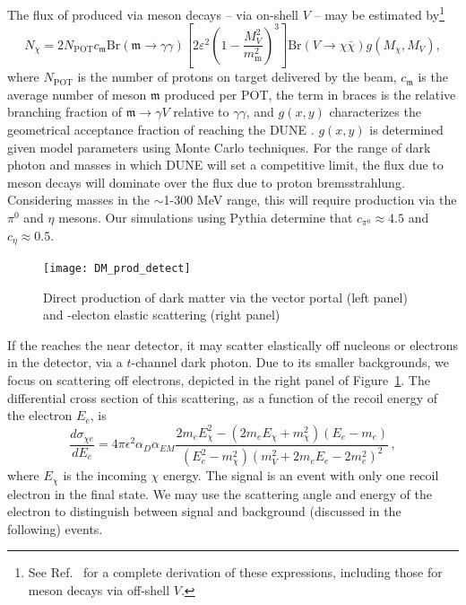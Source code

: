 The flux of  produced via meson decays -- via on-shell $V$ -- may be estimated by\footnote{See Ref.~\cite{DeRomeri:2019kic} for a complete derivation of these expressions, including those for meson decays via off-shell $V$.}
\begin{equation}
    N_\chi = 2 N_\mathrm{POT} c_\mathfrak{m} \mathrm{Br}(\mathfrak{m}\to \gamma\gamma) \left[ 2 \varepsilon^2 \left(1 - \frac{M_{V}^2}{m_\mathrm{m}^2}\right)^3\right] \mathrm{Br}(V \to \chi\bar{\chi}) g(M_\chi, M_{V}),
\end{equation}
where $N_\mathrm{POT}$ is the number of protons on target delivered by the beam, $c_\mathfrak{m}$ is the average number of meson $\mathfrak{m}$ produced per POT, the term in braces is the relative branching fraction of $\mathfrak{m} \to \gamma V$ relative to $\gamma\gamma$, and $g(x, y)$ characterizes the geometrical acceptance fraction of  reaching the DUNE . $g(x, y)$ is determined given model parameters using Monte Carlo techniques. For the range of dark photon and  masses in which DUNE will set a competitive limit, the  flux due to meson decays will dominate over the flux due to proton bremsstrahlung. Considering  masses in the $\sim$1-300 MeV range, this will require production via the $\pi^0$ and $\eta$ mesons. Our simulations using {\sc Pythia} determine that $c_{\pi^0} \approx 4.5$ and $c_\eta \approx 0.5$.

\begin{figure}[t]
\centering
\texttt{[image: DM\_prod\_detect]}
\caption[Direct production of DM via vector portal and DM-e$^-$ elastic scattering]{ 
Direct production of dark matter via the vector portal (left panel) and -electon elastic scattering (right panel)}
\label{fig:dm_prod}
\end{figure}

If the  reaches the near detector, it may scatter elastically off nucleons or electrons in the detector, via a $t$-channel dark photon. Due to its smaller backgrounds, we focus on scattering off electrons, depicted in the right panel of Figure~\ref{fig:dm_prod}. The differential cross section of this scattering, as a function of the recoil energy of the electron $E_e$, is
\begin{equation}
\frac{d\sigma_{{\chi}e}}{dE_{e}} 
= 4\pi \epsilon^{2}\alpha_D\alpha_{EM} \frac{2m_{e}E_{\chi}^{2} - (2m_{e}E_{\chi} + m_{\chi}^{2})(E_e-m_{e})}{(E_e^{2}-m_{\chi}^{2})(m_{V}^{2}+2m_{e}E_{e}-2m_{e}^{2})^{2}}\,,
\end{equation}
where $E_{\chi}$ is the incoming  $\chi$ energy. The signal is an event with only one recoil electron in the final state. We may use the scattering angle and energy of the electron to distinguish between signal and background (discussed in the following) events.

